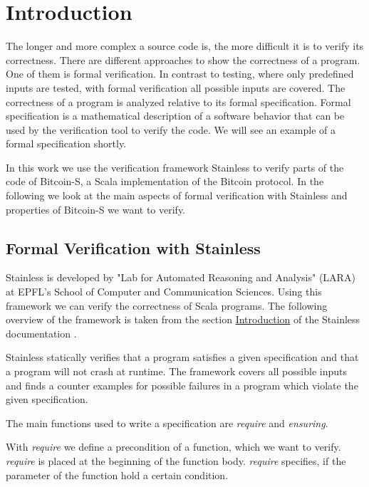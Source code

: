 \chapter{Introduction}
\label{chap:introduction}

The longer and more complex a source code is, the more difficult it is to verify its correctness.
There are different approaches to show the correctness of a program.
One of them is formal verification.
In contrast to testing, where only predefined inputs are tested, with formal verification all possible inputs are covered.
The correctness of a program is analyzed relative to its formal specification.
Formal specification is a mathematical description of a software behavior that can be used by the verification tool to verify the code.
We will see an example of a formal specification shortly.

In this work we use the verification framework Stainless to verify parts of the code of Bitcoin-S, a Scala implementation of the Bitcoin protocol.
In the following we look at the main aspects of formal verification with Stainless and properties of Bitcoin-S we want to verify.


\section{Formal Verification with Stainless}
\label{sec:stainless}

Stainless is developed by "Lab for Automated Reasoning and Analysis" (LARA) at EPFL's School of Computer and Communication Sciences.
Using this framework we can verify the correctness of Scala programs.
The following overview of the framework is taken from the section \href{https://epfl-lara.github.io/stainless/intro.html}{Introduction} of the Stainless documentation \cite{Stainless:documentation}.

Stainless statically verifies that a program satisfies a given specification and that a program will not crash at runtime.
The framework covers all possible inputs and finds a counter examples for possible failures in a program which violate the given specification.

The main functions used to write a specification are \textit{require} and \textit{ensuring}.

With \textit{require} we define a precondition of a function, which we want to verify.
\textit{require} is placed at the beginning of the function body.
\textit{require} specifies, if the parameter of the function hold a certain condition.

